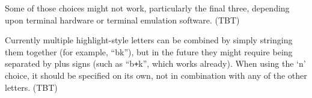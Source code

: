 Some of those choices might not work, particularly the final three,
depending upon terminal hardware or terminal emulation software.
(TBT)

Currently multiple highlight-style letters can be combined by simply
stringing them together (for example, ``bk''), but in the future
they might require being separated by plus signs (such as ``b\verb&+&k'',
which works already).
When using the `n' choice, it should be specified on its own,
not in combination with any of the other letters.
(TBT)

